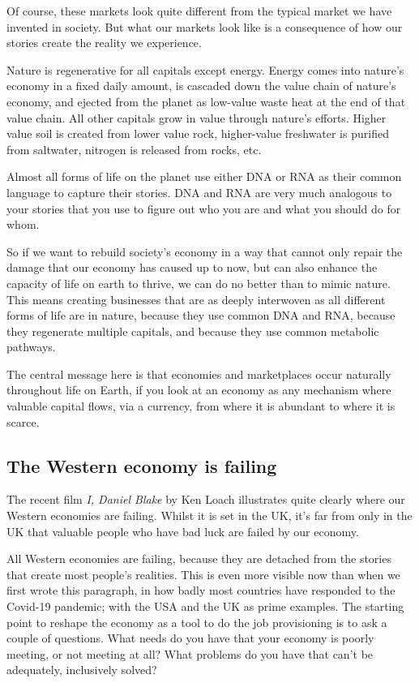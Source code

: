 Of course, these markets look quite different from the typical market we have invented in society. But what our markets look like is a consequence of how our stories create the reality we experience. 


Nature is regenerative for all capitals except energy. Energy comes into nature's economy in a fixed daily amount, is cascaded down the value chain of nature's economy, and ejected from the planet as low-value waste heat at the end of that value chain. All other capitals grow in value through nature's efforts. Higher value soil is created from lower value rock, higher-value freshwater is purified from saltwater, nitrogen is released from rocks, etc. 


Almost all forms of life on the planet use either DNA or RNA as their common language to capture their stories. DNA and RNA are very much analogous to your stories that you use to figure out who you are and what you should do for whom.


So if we want to rebuild society's economy in a way that cannot only repair the damage that our economy has caused up to now, but can also enhance the capacity of life on earth to thrive, we can do no better than to mimic nature. This means creating businesses that are as deeply interwoven as all different forms of life are in nature, because they use common DNA and RNA, because they regenerate multiple capitals, and because they use common metabolic pathways. 


The central message here is that economies and marketplaces occur naturally throughout life on Earth, if you look at an economy as any mechanism where valuable capital flows, via a currency, from where it is abundant to where it is scarce.
\subsection{The Western economy is failing}
\label{section:western-economy-failing}


The recent film \emph{I, Daniel Blake} by Ken Loach illustrates quite clearly where our Western economies are failing. Whilst it is set in the UK, it's far from only in the UK that valuable people who have bad luck are failed by our economy.


All Western economies are failing, because they are detached from the stories that create most people’s realities. This is even more visible now than when we first wrote this paragraph, in how badly most countries have responded to the Covid-19 pandemic; with the USA and the UK as prime examples. The starting point to reshape the economy as a tool to do the job provisioning is to ask a couple of questions. What needs do you have that your economy is poorly meeting, or not meeting at all? What problems do you have that can't be adequately, inclusively solved?


